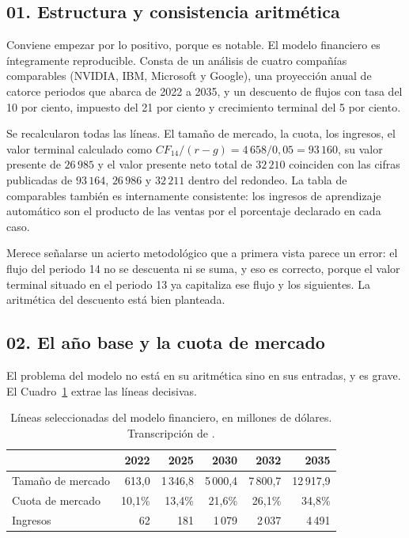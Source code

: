 \documentclass[11pt,letterpaper]{article}
\begin{document}
\subsection*{01. Estructura y consistencia aritmética}

Conviene empezar por lo positivo, porque es notable. El modelo financiero es
íntegramente reproducible. Consta de un análisis de cuatro compañías
comparables (NVIDIA, IBM, Microsoft y Google), una proyección anual de catorce
periodos que abarca de 2022 a 2035, y un descuento de flujos con tasa del 10
por ciento, impuesto del 21 por ciento y crecimiento terminal del 5 por ciento.

Se recalcularon todas las líneas. El tamaño de mercado, la cuota, los ingresos,
el valor terminal calculado como $CF_{14}/(r-g) = 4\,658/0{,}05 = 93\,160$, su
valor presente de $26\,985$ y el valor presente neto total de $32\,210$
coinciden con las cifras publicadas de $93\,164$, $26\,986$ y $32\,211$ dentro
del redondeo. La tabla de comparables también es internamente consistente: los
ingresos de aprendizaje automático son el producto de las ventas por el
porcentaje declarado en cada caso.

Merece señalarse un acierto metodológico que a primera vista parece un error:
el flujo del periodo 14 no se descuenta ni se suma, y eso es correcto, porque
el valor terminal situado en el periodo 13 ya capitaliza ese flujo y los
siguientes. La aritmética del descuento está bien planteada.

\subsection*{02. El año base y la cuota de mercado}

El problema del modelo no está en su aritmética sino en sus entradas, y es
grave. El Cuadro~\ref{tab:financiero} extrae las líneas decisivas.

\begin{table}[ht]
  \centering
  \small
  \caption{Líneas seleccionadas del modelo financiero, en millones de dólares.
  Transcripción de \textcite{numa2023}.}
  \label{tab:financiero}
  \begin{tabular}{@{}lrrrrr@{}}
    \toprule
    & \textbf{2022} & \textbf{2025} & \textbf{2030} & \textbf{2032} &
    \textbf{2035} \\
    \midrule
    Tamaño de mercado & 613,0 & 1\,346,8 & 5\,000,4 & 7\,800,7 & 12\,917,9 \\
    Cuota de mercado  & 10,1\% & 13,4\% & 21,6\% & 26,1\% & 34,8\% \\
    Ingresos          & 62 & 181 & 1\,079 & 2\,037 & 4\,491 \\
    \bottomrule
  \end{tabular}
\end{table}
\end{document}

